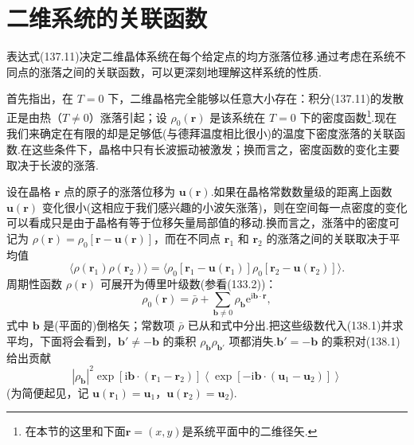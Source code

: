 \section{二维系统的关联函数}

表达式(137.11)决定二维晶体系统在每个给定点的均方涨落位移.通过考虑在系统不同点的涨落之间的关联函数，可以更深刻地理解这样系统的性质.

首先指出，在 $T=0$ 下，二维晶格完全能够以任意大小存在：积分(137.11)的发散正是由热（$T\neq0$）涨落引起；设 $\rho_0(\boldsymbol{r})$ 是该系统在 $T=0$ 下的密度函数\footnote{在本节的这里和下面$\boldsymbol{r}=(x,y)$是系统平面中的二维径矢.}.现在我们来确定在有限的却是足够低(与德拜温度相比很小)的温度下密度涨落的关联函数.在这些条件下，晶格中只有长波振动被激发；换而言之，密度函数的变化主要取决于长波的涨落.

设在晶格 $\boldsymbol{r}$ 点的原子的涨落位移为 $\boldsymbol{u}(\boldsymbol{r})$.如果在晶格常数数量级的距离上函数 $\boldsymbol{u}(\boldsymbol{r})$ 变化很小(这相应于我们感兴趣的小波矢涨落)，则在空间每一点密度的变化可以看成只是由于晶格有等于位移矢量局部值的移动.换而言之，涨落中的密度可记为 $\rho(\boldsymbol{r})=\rho_0[\boldsymbol{r}-\boldsymbol{u}(\boldsymbol{r})]$，而在不同点 $\boldsymbol{r}_1$ 和 $\boldsymbol{r}_2$ 的涨落之间的关联取决于平均值
\begin{equation}
  \langle\rho(\boldsymbol{r}_1)\rho(\boldsymbol{r}_2)\rangle
  =\bigl\langle\rho_0[\boldsymbol{r}_1-\boldsymbol{u}(\boldsymbol{r}_1)]
  \rho_0[\boldsymbol{r}_2-\boldsymbol{u}(\boldsymbol{r}_2)]\bigr\rangle.
\end{equation}
周期性函数 $\rho(\boldsymbol{r})$ 可展开为傅里叶级数(参看(133.2))：
\begin{equation}
  \rho_0(\boldsymbol{r})=\bar{\rho}
  +\sum_{\boldsymbol{b}\neq0}\rho_{\boldsymbol{b}}
  \mathrm{e}^{\mathrm{i}\boldsymbol{b}\cdot\boldsymbol{r}},
\end{equation}
式中 $\boldsymbol{b}$ 是(平面的)倒格矢；常数项 $\bar{\rho}$ 已从和式中分出.把这些级数代入(138.1)并求平均，下面将会看到，$\boldsymbol{b}'\neq-\boldsymbol{b}$ 的乘积 $\rho_{\boldsymbol{b}}\rho_{\boldsymbol{b}'}$ 项都消失.$\boldsymbol{b}'=-\boldsymbol{b}$ 的乘积对(138.1)给出贡献
\begin{equation}
  |\rho_{\boldsymbol{b}}|^2
  \exp[\mathrm{i}\boldsymbol{b}\cdot(\boldsymbol{r}_1-\boldsymbol{r}_2)]
  \left\langle\exp[-\mathrm{i}\boldsymbol{b}\cdot(\boldsymbol{u}_1-\boldsymbol{u}_2)]\right\rangle
\end{equation}
(为简便起见，记 $\boldsymbol{u}(\boldsymbol{r}_1)=\boldsymbol{u}_1$，$\boldsymbol{u}(\boldsymbol{r}_2)=\boldsymbol{u}_2$).


